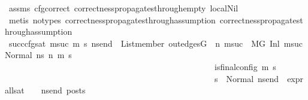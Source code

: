 \begin{isabellebody}
\ assms{\isacharparenleft}{\kern0pt}{}{\isacharminus}{\kern0pt}{}{\isacharparenright}{\kern0pt}\ cfg{\isacharunderscore}{\kern0pt}correct\ correctness{\isacharunderscore}{\kern0pt}propagates{\isacharunderscore}{\kern0pt}through{\isacharunderscore}{\kern0pt}empty\ local{\isachardot}{\kern0pt}Nil\isanewline
\ \ \ \ \ \ \ \ \isamarkupfalse%
\ {\isacharparenleft}{\kern0pt}metis\ {\isacharparenleft}{\kern0pt}no{\isacharunderscore}{\kern0pt}types{\isacharparenright}{\kern0pt}\ correctness{\isacharunderscore}{\kern0pt}propagates{\isacharunderscore}{\kern0pt}through{\isacharunderscore}{\kern0pt}assumption\ correctness{\isacharunderscore}{\kern0pt}propagates{\isacharunderscore}{\kern0pt}through{\isacharunderscore}{\kern0pt}assumption{}{\isacharparenright}{\kern0pt}\isanewline
\isanewline
\ \ \ \ \ \ \isamarkupfalse%
\ succ{\isacharunderscore}{\kern0pt}cfg{\isacharunderscore}{\kern0pt}sat{\isacharcolon}{\kern0pt}\ {\isachardoublequoteopen}{\isasymAnd}msuc{}\ m{\isacharprime}{\kern0pt}\ s{\isacharprime}{\kern0pt}\ ns{\isacharunderscore}{\kern0pt}end{\isachardot}{\kern0pt}\ \ List{\isachardot}{\kern0pt}member\ {\isacharparenleft}{\kern0pt}out{\isacharunderscore}{\kern0pt}edges{\isacharparenleft}{\kern0pt}G{\isacharparenright}{\kern0pt}\ {\isacharbang}{\kern0pt}\ n{\isacharparenright}{\kern0pt}\ msuc{}\ {\isasymLongrightarrow}\ {\isacharparenleft}{\kern0pt}M{\isacharcomma}{\kern0pt}{\isasymLambda}{\isacharcomma}{\kern0pt}{\isasymGamma}{\isacharcomma}{\kern0pt}{\isasymOmega}{\isacharcomma}{\kern0pt}G\ {\isasymturnstile}{\isacharparenleft}{\kern0pt}Inl\ {\isacharparenleft}{\kern0pt}msuc{}{\isacharparenright}{\kern0pt}{\isacharcomma}{\kern0pt}\ Normal\ ns{}{\isacharparenright}{\kern0pt}\ {\isacharminus}{\kern0pt}n{\isasymrightarrow}{\isacharasterisk}{\kern0pt}\ {\isacharparenleft}{\kern0pt}m{\isacharprime}{\kern0pt}{\isacharcomma}{\kern0pt}\ s{\isacharprime}{\kern0pt}{\isacharparenright}{\kern0pt}{\isacharparenright}{\kern0pt}\ {\isasymLongrightarrow}\isanewline
\ \ \ \ \ \ \ \ \ \ \ \ \ \ \ \ \ \ \ \ \ \ \ \ \ \ \ \ \ \ \ \ \ \ \ \ \ \ \ \ \ \ \ \ \ \ \ \ \ \ is{\isacharunderscore}{\kern0pt}final{\isacharunderscore}{\kern0pt}config\ {\isacharparenleft}{\kern0pt}m{\isacharprime}{\kern0pt}{\isacharcomma}{\kern0pt}\ s{\isacharprime}{\kern0pt}{\isacharparenright}{\kern0pt}\ {\isasymLongrightarrow}\ \isanewline
\ \ \ \ \ \ \ \ \ \ \ \ \ \ \ \ \ \ \ \ \ \ \ \ \ \ \ \ \ \ \ \ \ \ \ \ \ \ \ \ \ \ \ \ \ \ \ \ \ \ {\isacharparenleft}{\kern0pt}s{\isacharprime}{\kern0pt}\ {\isacharequal}{\kern0pt}\ Normal\ ns{\isacharunderscore}{\kern0pt}end{\isacharparenright}{\kern0pt}\ {\isasymlongrightarrow}\ {\isacharparenleft}{\kern0pt}expr{\isacharunderscore}{\kern0pt}all{\isacharunderscore}{\kern0pt}sat\ {\isasymLambda}\ {\isasymGamma}\ {\isasymOmega}\ ns{\isacharunderscore}{\kern0pt}end{\isacharparenright}{\kern0pt}\ posts{\isachardoublequoteclose}\isanewline

\end{isabellebody}
